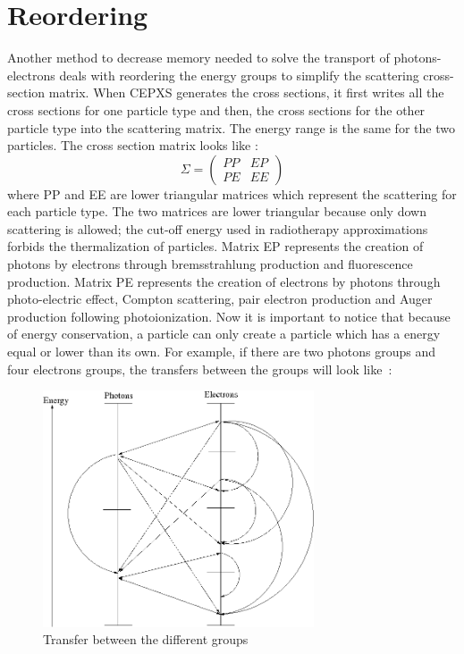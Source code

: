 \section{Reordering}
Another method to decrease memory needed to solve the transport of
photons-electrons deals with reordering the energy groups to simplify the
scattering cross-section matrix. When CEPXS generates the cross sections,
it first writes all the cross sections for one particle type and then, the cross
sections for the other particle type into the scattering matrix. The
energy range is the same for the two particles. The cross section matrix looks like :
\begin{equation}
\Sigma = 
\begin{pmatrix}
PP & EP\\
PE & EE
\end{pmatrix}
\end{equation}
where PP and EE are lower triangular matrices which represent the
scattering for each particle type. The two matrices are lower triangular
because only down scattering is allowed; the cut-off energy used in
radiotherapy approximations forbids the 
thermalization of particles. Matrix EP represents the creation of photons by
electrons through bremsstrahlung production and fluorescence production.
Matrix PE represents the creation of electrons by photons through photo-electric 
effect, Compton scattering, pair electron production and Auger production 
following photoionization. Now it is important to notice that because 
of energy conservation, a particle can only create a particle which has a 
energy equal or lower than its own. For example, if there are two photons
groups and four electrons groups, the transfers between the groups
will look \hbox{like :}
\begin{figure}[H]
\begin{center}
\includegraphics[height=7cm]{group.png}
\caption{Transfer between the different groups}        
\label{joli}
\end{center}
\end{figure}
